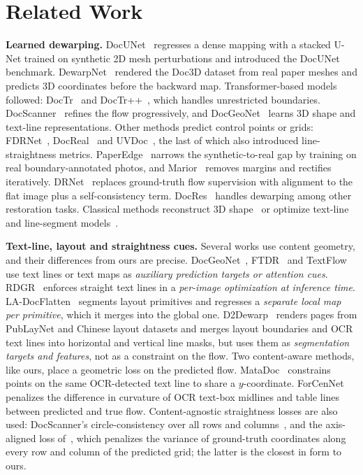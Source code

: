 \documentclass[a4paper,fleqn]{cas-sc}
\begin{document}
\section{Related Work}
\textbf{Learned dewarping.}
DocUNet~\cite{ma2018docunet} regresses a dense mapping with a stacked U-Net trained on synthetic 2D mesh perturbations and introduced the DocUNet benchmark. DewarpNet~\cite{das2019dewarpnet} rendered the Doc3D dataset from real paper meshes and predicts 3D coordinates before the backward map. Transformer-based models followed: DocTr~\cite{feng2021doctr} and DocTr++~\cite{feng2024doctrpp}, which handles unrestricted boundaries. DocScanner~\cite{feng2025docscanner} refines the flow progressively, and DocGeoNet~\cite{feng2022docgeonet} learns 3D shape and text-line representations. Other methods predict control points or grids: FDRNet~\cite{xue2022fdrnet}, DocReal~\cite{yu2024docreal} and UVDoc~\cite{verhoeven2023uvdoc}, the last of which also introduced line-straightness metrics. PaperEdge~\cite{ma2022paperedge} narrows the synthetic-to-real gap by training on real boundary-annotated photos, and Marior~\cite{zhang2022marior} removes margins and rectifies iteratively. DRNet~\cite{liu2024drnet} replaces ground-truth flow supervision with alignment to the flat image plus a self-consistency term. DocRes~\cite{zhang2024docres} handles dewarping among other restoration tasks. Classical methods reconstruct 3D shape~\cite{brown2001document} or optimize text-line and line-segment models~\cite{tian2011rectification,kim2015textline,kil2017robust}.

\textbf{Text-line, layout and straightness cues.}
Several works use content geometry, and their differences from ours are precise. DocGeoNet~\cite{feng2022docgeonet}, FTDR~\cite{li2023ftdr} and TextFlow~\cite{liu2026textflow} use text lines or text maps as \emph{auxiliary prediction targets or attention cues}. RDGR~\cite{jiang2022rdgr} enforces straight text lines in a \emph{per-image optimization at inference time}. LA-DocFlatten~\cite{li2024ladocflatten} segments layout primitives and regresses a \emph{separate local map per primitive}, which it merges into the global one. D2Dewarp~\cite{li2026d2dewarp} renders pages from PubLayNet and Chinese layout datasets and merges layout boundaries and OCR text lines into horizontal and vertical line masks, but uses them as \emph{segmentation targets and features}, not as a constraint on the flow. Two content-aware methods, like ours, place a geometric loss on the predicted flow. MataDoc~\cite{dai2023matadoc} constrains points on the same OCR-detected text line to share a $y$-coordinate. ForCenNet~\cite{cai2025forcennet} penalizes the difference in curvature of OCR text-box midlines and table lines between predicted and true flow. Content-agnostic straightness losses are also used: DocScanner's circle-consistency over all rows and columns~\cite{feng2025docscanner}, and the axis-aligned loss of~\cite{wang2026aadd}, which penalizes the variance of ground-truth coordinates along every row and column of the predicted grid; the latter is the closest in form to ours.
\end{document}
